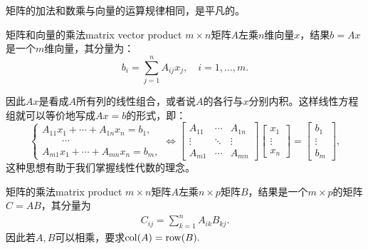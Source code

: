 矩阵的加法和数乘与向量的运算规律相同，是平凡的。
\begin{definition}{矩阵和向量的乘法}{matrix vector product}
	$m\times n$矩阵$A$左乘$n$维向量$x$，结果$b=Ax$是一个$m$维向量，其分量为：
	\begin{equation}
		b_i=\sum_{j=1}^nA_{ij}x_j,\quad i=1,\ldots,m.
	\end{equation}
\end{definition}
因此$Ax$是看成$A$所有列的线性组合，或者说$A$的各行与$x$分别内积。这样线性方程组就可以等价地写成$Ax=b$的形式，即：
\[
	\begin{cases}
        A_{11}x_1+\cdots+A_{1n}x_n=b_1,\\
        \qquad\cdots\\
        A_{m1}x_1+\cdots+A_{mn}x_n=b_m,
    \end{cases}\iff
    \begin{bmatrix}
        A_{11}&\cdots&A_{1n}\\
        \vdots&\ddots&\vdots\\
        A_{m1}&\cdots&A_{mn}
    \end{bmatrix}
    \begin{bmatrix}
        x_1\\\vdots\\x_n
    \end{bmatrix}=
    \begin{bmatrix}
        b_1\\\vdots\\b_m
    \end{bmatrix},
\]
这种思想有助于我们掌握线性代数的理念。
\begin{definition}{矩阵的乘法}{matrix product}
	$m\times n$矩阵$A$左乘$n\times p$矩阵$B$，结果是一个$m\times p$的矩阵$C=AB$，其分量为
	\begin{align}
		C_{ij}=\sum_{k=1}^nA_{ik}B_{kj}.
	\end{align}
	因此若$A,B$可以相乘，要求$\operatorname{col}(A)=\operatorname{row}(B).$
\end{definition}
